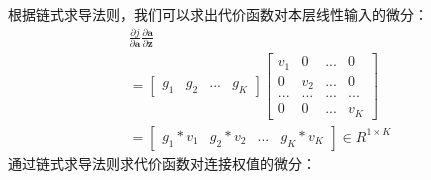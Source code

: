 \documentclass[UTF8]{article}
\begin{document}
根据链式求导法则，我们可以求出代价函数对本层线性输入的微分：
\begin{equation}
\begin{aligned}
\frac{\partial{j}}{\partial{\boldsymbol{a}}} \frac{\partial{\boldsymbol{a}}}{\partial{\boldsymbol{z}}} \\
 =\begin{bmatrix}
 g_{1} & g_{2}　& ... & g_{K}
 \end{bmatrix}
 \begin{bmatrix}
 v_{1} & 0 & ... & 0 \\
0 & v_{2} & ... & 0 \\
... & ... & ... & ... \\
0 & 0 & ... & v_{K}
\end{bmatrix} \\
 =\begin{bmatrix}
 g_{1}*v_{1} & g_{2}*v_{2} & ... & g_{K}*v_{K}
 \end{bmatrix} \in R^{1 \times K}
\end{aligned}
\label{mlp-leaky-relu-pj-pz-def1}
\end{equation}
通过链式求导法则求代价函数对连接权值的微分：
\end{document}
